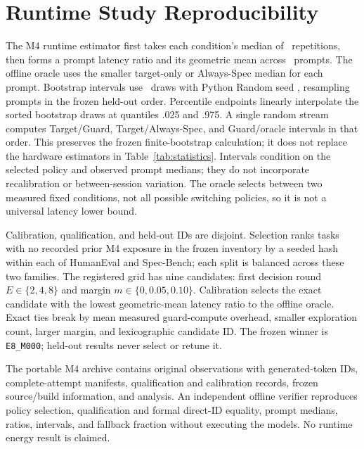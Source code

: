 \documentclass{article}
\begin{document}
\section{Runtime Study Reproducibility}
The M4 runtime estimator first takes each condition's median of \RTReps\ repetitions, then forms a prompt latency ratio and its geometric mean across \RTPrompts\ prompts. The offline oracle uses the smaller target-only or Always-Spec median for each prompt. Bootstrap intervals use \RTBootstrap\ draws with Python Random seed \RTSeed, resampling prompts in the frozen held-out order. Percentile endpoints linearly interpolate the sorted bootstrap draws at quantiles .025 and .975. A single random stream computes Target/Guard, Target/Always-Spec, and Guard/oracle intervals in that order. This preserves the frozen finite-bootstrap calculation; it does not replace the hardware estimators in Table~\ref{tab:statistics}. Intervals condition on the selected policy and observed prompt medians; they do not incorporate recalibration or between-session variation. The oracle selects between two measured fixed conditions, not all possible switching policies, so it is not a universal latency lower bound.

Calibration, qualification, and held-out IDs are disjoint. Selection ranks tasks with no recorded prior M4 exposure in the frozen inventory by a seeded hash within each of HumanEval and Spec-Bench; each split is balanced across these two families. The registered grid has nine candidates: first decision round $E\in\{2,4,8\}$ and margin $m\in\{0,0.05,0.10\}$. Calibration selects the exact candidate with the lowest geometric-mean latency ratio to the offline oracle. Exact ties break by mean measured guard-compute overhead, smaller exploration count, larger margin, and lexicographic candidate ID. The frozen winner is \texttt{E8\_M000}; held-out results never select or retune it.

The portable M4 archive contains original observations with generated-token IDs, complete-attempt manifests, qualification and calibration records, frozen source/build information, and analysis. An independent offline verifier reproduces policy selection, qualification and formal direct-ID equality, prompt medians, ratios, intervals, and fallback fraction without executing the models. No runtime energy result is claimed.
\end{document}

